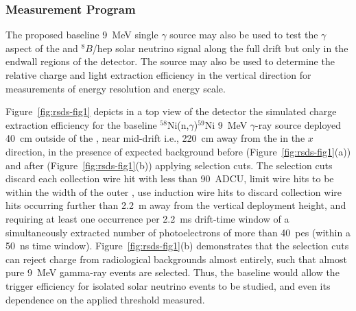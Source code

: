 \subsubsection{Measurement Program}
\label{sec:sp-calib-sys-src-dep-meas}

The proposed baseline 9~MeV single $\gamma$ source may also be used to test the $\gamma$ aspect of the  and $^{8}B$/hep solar neutrino signal along the full drift but only in the endwall regions of the detector. The source may also be used to determine the relative charge and light extraction efficiency in the vertical direction for measurements of energy resolution and energy scale. 

Figure~\ref{fig:rsds-fig1}
depicts in a top view of the detector the simulated charge extraction efficiency for the baseline $^{58}$Ni(n,$\gamma$)$^{59}$Ni 9~MeV $\gamma$-ray source deployed \SI{40}{\cm} outside of the , near mid-drift i.e., \SI{220}{\cm} away from the  in the $x$ direction, in the presence of expected background before (Figure~\ref{fig:rsds-fig1}(a)) and after (Figure~\ref{fig:rsds-fig1}(b)) applying selection cuts. The selection cuts discard each collection wire hit with less than 90~ADCU, limit wire hits to be within the width of the outer , use induction wire hits to discard collection wire hits occurring further than \SI{2.2}{\m} away from the vertical deployment height, and requiring at least one occurrence per \SI{2.2}{\ms} drift-time window of a simultaneously extracted number of photoelectrons of more than 40~pes (within a \SI{50}{\ns} time window).
Figure~\ref{fig:rsds-fig1}(b)
demonstrates that the selection cuts can reject charge from radiological backgrounds almost entirely, such that almost pure 9~MeV gamma-ray events are selected. Thus, the baseline  would allow the trigger efficiency for isolated solar neutrino events to be studied, and even its dependence on the applied threshold measured. 


